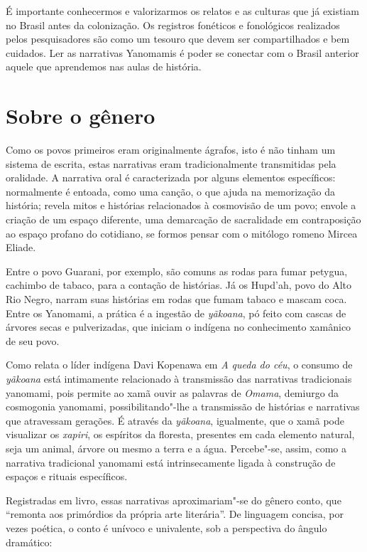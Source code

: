 É importante conhecermos e valorizarmos os relatos e as culturas que já
existiam no Brasil antes da colonização. Os registros fonéticos e
fonológicos realizados pelos pesquisadores são como um tesouro que devem
ser compartilhados e bem cuidados. Ler as narrativas Yanomamis é poder
se conectar com o Brasil anterior aquele que aprendemos nas aulas de
história.

\section{Sobre o gênero}

Como os povos primeiros eram originalmente ágrafos, isto é não tinham um sistema de escrita, estas narrativas eram tradicionalmente transmitidas pela oralidade.
A narrativa oral é caracterizada por alguns elementos específicos: normalmente é entoada, como uma canção, o que ajuda na memorização da história; revela mitos e histórias relacionados à cosmovisão de um povo; envole a criação de um espaço diferente, uma demarcação de sacralidade em contraposição ao espaço profano do cotidiano, se formos pensar com o mitólogo romeno Mircea Eliade.

Entre o povo Guarani, por exemplo, são comuns as rodas para fumar petygua, cachimbo de tabaco, para a contação de histórias. Já os Hupd’ah, povo do Alto Rio Negro, narram suas histórias em rodas que fumam tabaco e mascam coca.
Entre os Yanomami, a prática é a ingestão de \textit{yãkoana}, pó feito com cascas de árvores secas e pulverizadas, que iniciam o indígena no conhecimento xamânico de seu povo.

Como relata o líder indígena Davi Kopenawa em \textit{A queda do céu}, o consumo
de \textit{yãkoana} está intimamente relacionado à transmissão das narrativas tradicionais yanomami, pois permite ao xamã ouvir as palavras de \textit{Omama}, demiurgo da cosmogonia yanomami, possibilitando"-lhe a transmissão de histórias e narrativas que atravessam gerações. É através da \textit{yãkoana}, igualmente, que o xamã pode visualizar os \textit{xapiri}, os espíritos da floresta, presentes em cada elemento natural, seja um animal, árvore ou mesmo a terra e a água.
Percebe"-se, assim, como a narrativa tradicional yanomami está intrinsecamente ligada à construção de espaços e rituais específicos.

Registradas em livro, essas narrativas aproximariam"-se do gênero conto,
que ``remonta aos primórdios da própria arte literária''.
De linguagem concisa, por vezes poética, o conto é unívoco e univalente, sob a perspectiva do ângulo dramático:

